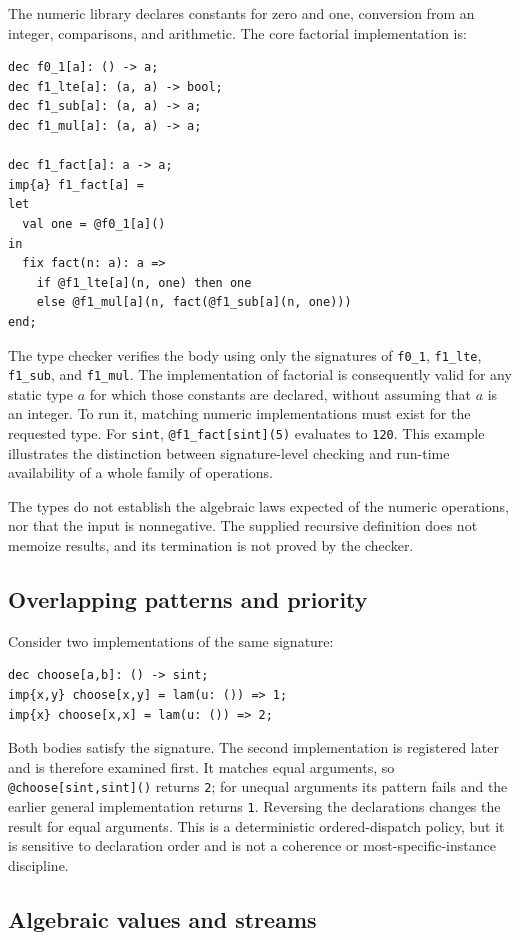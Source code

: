 \documentclass[11pt]{article}
\begin{document}
The numeric library declares constants for zero and one, conversion from an
integer, comparisons, and arithmetic. The core factorial implementation is:
\begin{lstlisting}
dec f0_1[a]: () -> a;
dec f1_lte[a]: (a, a) -> bool;
dec f1_sub[a]: (a, a) -> a;
dec f1_mul[a]: (a, a) -> a;

dec f1_fact[a]: a -> a;
imp{a} f1_fact[a] =
let
  val one = @f0_1[a]()
in
  fix fact(n: a): a =>
    if @f1_lte[a](n, one) then one
    else @f1_mul[a](n, fact(@f1_sub[a](n, one)))
end;
\end{lstlisting}
The type checker verifies the body using only the signatures of
\texttt{f0\_1}, \texttt{f1\_lte}, \texttt{f1\_sub}, and
\texttt{f1\_mul}. The implementation of factorial is consequently valid for
any static type \(a\) for which those constants are declared, without
assuming that \(a\) is an integer. To run it, matching numeric
implementations must exist for the requested type. For \texttt{sint},
\texttt{@f1\_fact[sint](5)} evaluates to \texttt{120}. This example
illustrates the distinction between signature-level checking and run-time
availability of a whole family of operations.

The types do not establish the algebraic laws expected of the numeric
operations, nor that the input is nonnegative. The supplied recursive
definition does not memoize results, and its termination is not proved by the
checker.

\subsection{Overlapping patterns and priority}

Consider two implementations of the same signature:
\begin{lstlisting}
dec choose[a,b]: () -> sint;
imp{x,y} choose[x,y] = lam(u: ()) => 1;
imp{x} choose[x,x] = lam(u: ()) => 2;
\end{lstlisting}
Both bodies satisfy the signature. The second implementation is registered
later and is therefore examined first. It matches equal arguments, so
\texttt{@choose[sint,sint]()} returns \texttt{2}; for unequal arguments its
pattern fails and the earlier general implementation returns \texttt{1}.
Reversing the declarations changes the result for equal arguments. This is a
deterministic ordered-dispatch policy, but it is sensitive to declaration
order and is not a coherence or most-specific-instance discipline.

\subsection{Algebraic values and streams}
\end{document}
